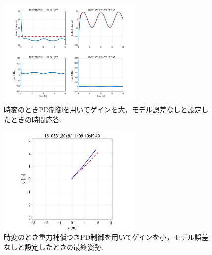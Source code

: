 \documentclass[twocolumn, 10pt,a4j]{jsarticle}
\begin{document}
    \begin{figure}[H]
      \begin{center}
        \includegraphics[width=7cm]{../img/img/kansetu_PD_zihen_large_no_model_gosa_zikan_auto.jpg}
        \caption{時変のときPD制御を用いてゲインを大，モデル誤差なしと設定したときの時間応答.}
      \end{center}
    \end{figure}
    \begin{figure}[H]
      \begin{center}
        \includegraphics[width=7cm]{../img/img/kansetu_juryoku_hosyo_PD_zihen_small_no_model_gosa_saisyu_sisei.jpg}
        \caption{時変のとき重力補償つきPD制御を用いてゲインを小，モデル誤差なしと設定したときの最終姿勢.}
      \end{center}
    \end{figure}
\end{document}
